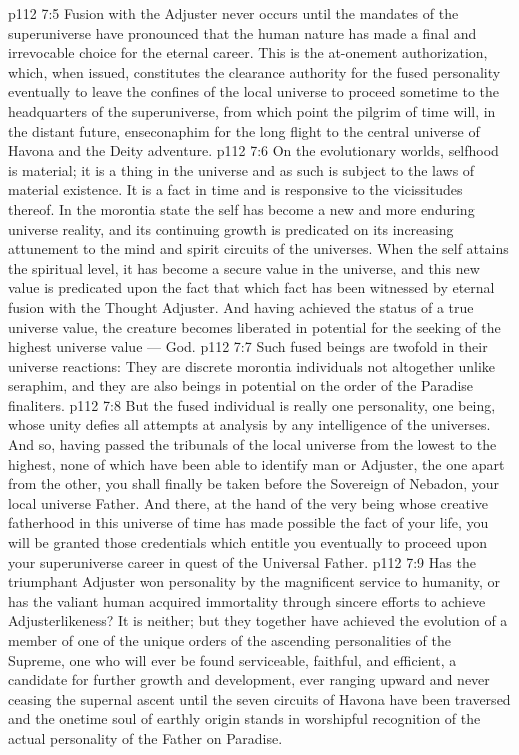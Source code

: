 \vs p112 7:5 Fusion with the Adjuster never occurs until the mandates of the superuniverse have pronounced that the human nature has made a final and irrevocable choice for the eternal career. This is the at\hyp{}onement authorization, which, when issued, constitutes the clearance authority for the fused personality eventually to leave the confines of the local universe to proceed sometime to the headquarters of the superuniverse, from which point the pilgrim of time will, in the distant future, enseconaphim for the long flight to the central universe of Havona and the Deity adventure.
\vs p112 7:6 \pc On the evolutionary worlds, selfhood is material; it is a thing in the universe and as such is subject to the laws of material existence. It is a fact in time and is responsive to the vicissitudes thereof.  In the morontia state the self has become a new and more enduring universe reality, and its continuing growth is predicated on its increasing attunement to the mind and spirit circuits of the universes.  When the self attains the spiritual level, it has become a secure value in the universe, and this new value is predicated upon the fact that  which fact has been witnessed by eternal fusion with the Thought Adjuster. And having achieved the status of a true universe value, the creature becomes liberated in potential for the seeking of the highest universe value --- God.
\vs p112 7:7 \pc Such fused beings are twofold in their universe reactions: They are discrete morontia individuals not altogether unlike seraphim, and they are also beings in potential on the order of the Paradise finaliters.
\vs p112 7:8 But the fused individual is really one personality, one being, whose unity defies all attempts at analysis by any intelligence of the universes. And so, having passed the tribunals of the local universe from the lowest to the highest, none of which have been able to identify man or Adjuster, the one apart from the other, you shall finally be taken before the Sovereign of Nebadon, your local universe Father. And there, at the hand of the very being whose creative fatherhood in this universe of time has made possible the fact of your life, you will be granted those credentials which entitle you eventually to proceed upon your superuniverse career in quest of the Universal Father.
\vs p112 7:9 Has the triumphant Adjuster won personality by the magnificent service to humanity, or has the valiant human acquired immortality through sincere efforts to achieve Adjusterlikeness? It is neither; but they together have achieved the evolution of a member of one of the unique orders of the ascending personalities of the Supreme, one who will ever be found serviceable, faithful, and efficient, a candidate for further growth and development, ever ranging upward and never ceasing the supernal ascent until the seven circuits of Havona have been traversed and the onetime soul of earthly origin stands in worshipful recognition of the actual personality of the Father on Paradise.
